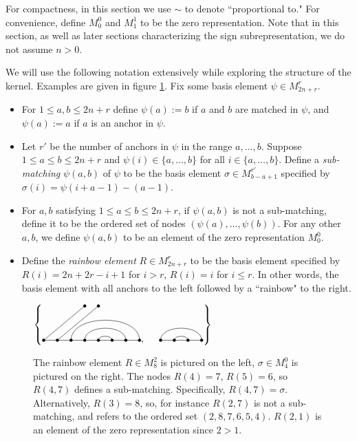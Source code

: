 \documentclass{amsart}
\begin{document}
For compactness, in this section we use $\sim $ to denote ``proportional to." For convenience, define $M_0^0$ and $M_1^1$ to be the zero representation. Note that in this section, as well as later sections characterizing the sign subrepresentation, we do not assume $n>0$.

\begin{definition}
	We will use the following notation extensively while exploring the structure of the kernel. Examples are given in figure \ref{sub-matching example}. Fix some basis element $\psi\in M_{2n+r}^r$. 
	
	
	\begin{itemize}
		\item For $1 \leq a,b \leq 2n + r$ define $\psi(a):=b$ if $a$ and $b$ are matched in $\psi$, and $\psi(a):=a$ if $a$ is an anchor in $\psi$. 
		
		
		\item Let $r'$ be the number of anchors in $\psi$ in the range $a,\ldots,b$. Suppose $1\leq a\leq b\leq 2n+r$ and $\psi(i)\in \{a,\ldots,b\}$ for all $i\in \{a,\ldots,b\}$. Define a \emph{sub-matching} $\psi(a,b)$ of $\psi$ to be the basis element $\sigma\in M_{b-a+1}^{r'}$ specified by $\sigma(i)=\psi(i+a-1)-(a-1)$.
		
		\item For $a,b$ satisfying $1\leq a\leq b\leq 2n+r$, if $\psi(a,b)$ is not a sub-matching, define it to be the ordered set of nodes $(\psi(a),\ldots,\psi(b))$. For any other $a,b$, we define $\psi(a,b)$ to be an element of the zero representation $M_0^0$.
		
		\item Define the \emph{rainbow element} $R\in M_{2n+r}^r$ to be the basis element specified by $R(i)=2n+2r-i+1$ for $i>r$, $R(i)=i$ for $i\leq r$. In other words, the basis element with all anchors to the left followed by a ``rainbow" to the right.
	\end{itemize}
	
	\label{sub-matchings}
\end{definition}

\begin{figure} 
	\def\cbasisspacing{5mm}
	$\cbr{
		\begin{gathered}
		\GeneralizedMatching{8}{3/8, 4/7, 5/6}{2}{1/1,2/2}{5/4}, \hspace{\cbasisspacing}
		\Matching{4}{1/4, 2/3}
		\end{gathered}}$
	\caption{The rainbow element $R\in M_8^2$ is pictured on the left, $\sigma\in M_4^0$ is pictured on the right. The nodes $R(4)=7$, $R(5)=6$, so $R(4,7)$ defines a sub-matching. Specifically, $R(4,7)=\sigma$. Alternatively, $R(3)=8$, so, for instance $R(2,7)$ is not a sub-matching, and refers to the ordered set $(2,8,7,6,5,4)$. $R(2,1)$ is an element of the zero representation since $2>1$.}
	\label{sub-matching example}
\end{figure}
\end{document}
